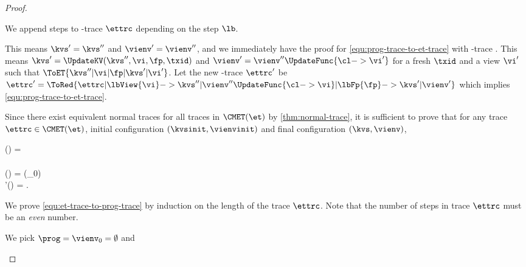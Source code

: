 \begin{proof}
\begin{enumerate}
\begin{enumerate}
        We append steps to \et-trace \( \ettrc \) depending on the step \( \lb \).
        \begin{enumerate*}
        \Case{\( \lb = \lbPri \)}
            This means \( \kvs' = \kvs'' \) and \(\vienv' = \vienv'' \), 
            and we immediately have the proof for \cref{equ:prog-trace-to-et-trace} with \et-trace \ettrc.
        \Case{\( \lb = \lbTrans{\vi,\fp} \)}
            This means \( \kvs' = \UpdateKV(\kvs'',\vi,\fp,\txid) \) and \(\vienv' = \vienv''\UpdateFunc{\cl -> \vi' } \)
            for a fresh \( \txid \) and a view \( \vi' \) such that \( \ToET{\kvs'' | \vi | \fp | \kvs' | \vi'} \).
            Let the new \et-trace \( \ettrc' \) be 
            \(
                \ettrc' =  \ToRed{\ettrc | \lbView{\vi} ->  \kvs'' | \vienv''\UpdateFunc{\cl -> \vi} | \lbFp{\fp} -> \kvs' | \vienv' }
            \)
            which implies \cref{equ:prog-trace-to-et-trace}.
        \end{enumerate*}
    \end{enumerate}
\Case{\(\CMET(\et) \subseteq \bigcup_{\prog \in \Programs} \EvalET{\prog} \)}
    Since there exist equivalent normal traces for all traces in \( \CMET(\et) \) by \cref{thm:normal-trace},
    it is sufficient to prove that for any trace \( \ettrc \in \CMET(\et) \),
    initial configuration \( (\kvsinit,\vienvinit) \) and final configuration \( (\kvs, \vienv) \),
    \begin{Formulae}
    \begin{Formula}
    \NormalTrace(\ettrc)
    \land \ettrc =  \ToRed{ \kvsinit | \vienvinit | \stub | * -> \kvs | \vienv }
    \implies 
    \\ 
    \\ \Dom(\prog) = \Dom(\clenv_0) 
    \land  {}
    \\ \land {} \prog'(\cl) = \pskip .
    \label{equ:et-trace-to-prog-trace}
    \end{Formula}
    \end{Formulae}
    We prove \cref{equ:et-trace-to-prog-trace} by induction on the length of the trace \( \ettrc \).
    Note that the number of steps in trace \( \ettrc \) must be an \emph{even} number.
    \begin{enumerate}
    \CaseBase{\(\ettrc =  \ToRed{ \kvsinit | \vienvinit }\)}
        We pick \( \prog = \vienv_0 = \emptyset \) and 

\end{enumerate}
\end{enumerate}
\end{proof}
